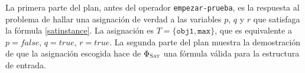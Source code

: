 La primera parte del plan, antes del operador \texttt{empezar-prueba}, es la
respuesta al problema de hallar una asignación de verdad a las variables $p$,
$q$ y $r$ que satisfaga la fórmula \ref{satinstance}. La asignación es $T =
\{\texttt{obj1}, \texttt{max}\}$, que es equivalente a $p = false$, $q = true$, $r = true$.
La segunda parte del plan muestra la demostración de que la asignación escogida
hace de $\Phi_{\textsc{Sat}}$ una fórmula válida para la estructura de entrada.
